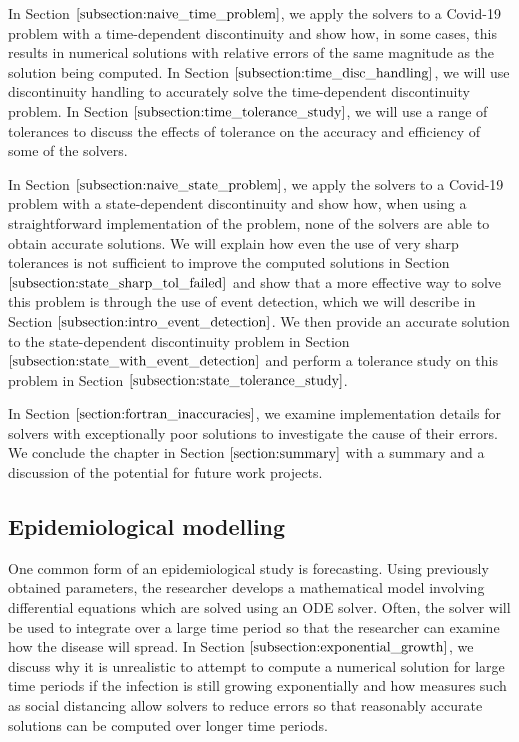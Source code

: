 In Section $\ref{subsection:naive_time_problem}$, we apply the solvers to a Covid-19 problem with a time-dependent discontinuity and show how, in some cases, this results in numerical solutions with relative errors of the same magnitude as the solution being computed. In Section $\ref{subsection:time_disc_handling}$, we will use discontinuity handling to accurately solve the time-dependent discontinuity problem. In Section $\ref{subsection:time_tolerance_study}$, we will use a range of tolerances to discuss the effects of tolerance on the accuracy and efficiency of some of the solvers.

In Section $\ref{subsection:naive_state_problem}$, we apply the solvers to a Covid-19 problem with a state-dependent discontinuity and show how, when using a straightforward implementation of the problem, none of the solvers are able to obtain accurate solutions. We will explain how even the use of very sharp tolerances is not sufficient to improve the computed solutions in Section $\ref{subsection:state_sharp_tol_failed}$ and show that a more effective way to solve this problem is through the use of event detection, which we will describe in Section $\ref{subsection:intro_event_detection}$. We then provide an accurate solution to the state-dependent discontinuity problem in Section $\ref{subsection:state_with_event_detection}$ and perform a tolerance study on this problem in Section $\ref{subsection:state_tolerance_study}$.

In Section $\ref{section:fortran_inaccuracies}$, we examine implementation details for solvers with exceptionally poor solutions to investigate the cause of their errors. We conclude the chapter in Section $\ref{section:summary}$ with a summary and a discussion of the potential for future work projects.

\subsection{Epidemiological modelling}
\label{subsection:research_papers}
One common form of an epidemiological study is forecasting. Using previously obtained parameters, the researcher develops a mathematical model involving differential equations which are solved using an ODE solver. Often, the solver will be used to integrate over a large time period so that the researcher can examine how the disease will spread. In Section $\ref{subsection:exponential_growth}$, we discuss why it is unrealistic to attempt to compute a numerical solution for large time periods if the infection is still growing exponentially and how measures such as social distancing allow solvers to reduce errors so that reasonably accurate solutions can be computed over longer time periods.

